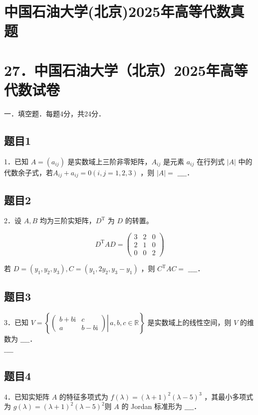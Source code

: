\documentclass{article}
\begin{document}
\section*{中国石油大学(北京)2025年高等代数真题}
\section*{27．中国石油大学（北京）2025年高等代数试卷}
一．填空题．每题4分，共24分．\\

\subsection{题目1}
1．已知 \(A=\left(a_{i j}\right)\) 是实数域上三阶非零矩阵，\(A_{i j}\) 是元素 \(a_{i j}\) 在行列式 \(|A|\) 中的代数余子式，若\(A_{i j}+a_{i j}=0(i, j=1,2,3)\) ，则 \(|A|=\) \(\_\_\_\_\)．

\subsection{题目2}
2．设 \(A, B\) 均为三阶实矩阵，\(D^{\mathrm{T}}\) 为 \(D\) 的转置。

\[
D^{\mathrm{T}} A D=\left(\begin{array}{lll}
3 & 2 & 0 \\
2 & 1 & 0 \\
0 & 0 & 2
\end{array}\right)
\]

若 \(D=\left(y_{1}, y_{2}, y_{3}\right), C=\left(y_{1}, 2 y_{2}, y_{3}-y_{1}\right)\) ，则 \(C^{\mathrm{T}} A C=\) \(\_\_\_\_\)．

\subsection{题目3}
3．已知 \(V=\left\{\left.\left(\begin{array}{cc}b+b \mathrm{i} & c \\ a & b-b \mathrm{i}\end{array}\right) \right\rvert\, a, b, c \in \mathbb{R}\right\}\) 是实数域上的线性空间，则 \(V\) 的维数为 \(\_\_\_\_\)．\\
\(\_\_\_\_\)

\subsection{题目4}
4．已知实矩阵 \(A\) 的特征多项式为 \(f(\lambda)=(\lambda+1)^{2}(\lambda-5)^{3}\) ，其最小多项式为 \(g(\lambda)=(\lambda+1)^{2}(\lambda-5)^{2}\)则 \(A\) 的 Jordan 标准形为 \(\_\_\_\_\)．
\end{document}
